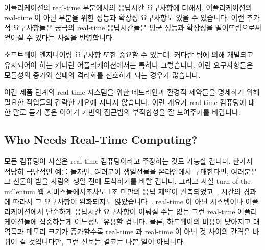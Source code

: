어플리케이션의 real-time 부분에서의 응답시간 요구사항에 더해서, 어플리케이션의
real-time 이 아닌 부분을 위한 성능과 확장성 요구사항도 있을 수 있습니다.
이런 추가적 요구사항들은 궁극의 real-time 응답시간들은 평균 성능과 확장성을
떨어뜨림으로써 얻어질 수 있다는 사실을 반영합니다.

소프트웨어 엔지니어링 요구사항 또한 중요할 수 있는데, 커다란 팀에 의해 개발되고
유지되어야 하는 커다란 어플리케이션에서는 특히나 그렇습니다.
이런 요구사항들은 모듈성의 증가와 실패의 격리화를 선호하게 되는 경우가
많습니다.

이건 제품 단계의 real-time 시스템을 위한 데드라인과 환경적 제약들을 명세하기
위해 필요한 작업들의 간략한 개요에 지나지 않습니다.
이런 개요가 real-time 컴퓨팅에 대한 말로 듣기 좋은 이야기 기반의 접근법의
부적합성을 잘 보여주기를 바랍니다.

\subsection{Who Needs Real-Time Computing?}
\label{sec:advsync:Who Needs Real-Time Computing?}

모든 컴퓨팅이 사실은 real-time 컴퓨팅이라고 주장하는 것도 가능할 겁니다.
한가지 적당히 극단적인 예를 들자면, 여러분이 생일선물을 온라인에서 구매한다면,
여러분은 그 선물이 받을 사람의 생일 전에 도착하기를 바랄 겁니다.
그리고 사실 turn-of-the-millenium 웹 서비스들에서조차도 1초 미만의 응답 제약이
관측되었고~\cite{KristofferBohmann2001a}, 시간의 경과에 따라서 그 요구사항이
완화되지도 않았습니다~\cite{DeCandia:2007:DAH:1323293.1294281}.
real-time 이 아닌 시스템이나 어플리케이션에서 단순하게 응답시간 요구사항이
이뤄질 수는 없는 그런 real-time 어플리케이션들에 집중하는게 어느정도 유용할
겁니다.
물론, 하드웨어의 비용이 낮아지고 대역폭과 메모리 크기가 증가할수록 real-time 과
real-time 이 아닌 것 사이의 간격은 바뀌어 갈 것입니다만, 그런 진보는 결코는
나쁜 일이 아닙니다.
\iffalse


